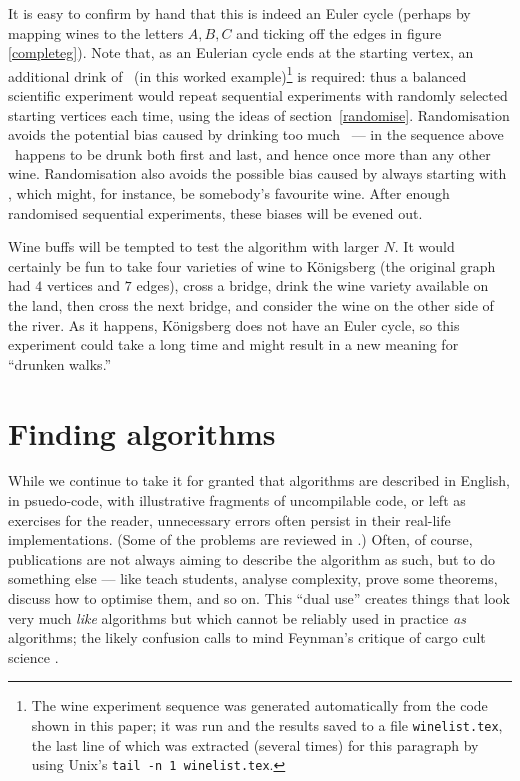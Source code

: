 \documentclass[12pt]{article}
\begin{document}
It is easy to confirm by hand that this is indeed an Euler cycle (perhaps by mapping wines to the letters $A,B,C$ and ticking off the edges in figure \ref{completeg}). Note that, as an Eulerian cycle ends at the starting vertex, an additional drink of \unskip\ (in this worked example)\footnote{The wine experiment sequence was generated automatically from the code shown in this paper; it was run and the results saved to a file \texttt{winelist.tex}, the last line of which was extracted (several times) for this paragraph by using Unix's \texttt{tail -n 1 winelist.tex}.} is required: thus a balanced scientific experiment would repeat sequential experiments with randomly selected starting vertices each time, using the ideas of section~\ref{randomise}. Randomisation avoids the potential bias caused by drinking too much \unskip\ --- in the sequence above \unskip\ happens to be drunk both first and last, and hence once more than any other wine. Randomisation also avoids the possible bias caused by always starting with \unskip, which might, for instance, be somebody's favourite wine. After enough randomised sequential experiments, these biases will be evened out.


Wine buffs will be tempted to test the algorithm with larger $N$\@. It would certainly be fun to take four varieties of wine to K\"onigsberg (the original graph had $4$ vertices and $7$ edges), cross a bridge, drink the wine variety available on the land, then cross the next bridge, and consider the wine on the other side of the river. As it happens, K\"onigsberg does not have an Euler cycle, so this experiment could take a long time and might result in a new meaning for ``drunken walks.''

\section{Finding algorithms}\label{new-approach}
While we continue to take it for granted that algorithms are described in English, in psuedo-code, with illustrative fragments of uncompilable code, or left as exercises for the reader, unnecessary errors often persist in their real-life implementations. (Some of the problems are reviewed in \cite{heedless,jmlr}.) Often, of course, publications are not always aiming to describe the algorithm as such, but to do something else --- like teach students, analyse complexity, prove some theorems, discuss how to optimise them, and so on. This ``dual use'' creates things that look very much \emph{like\/} algorithms but which cannot be reliably used in practice \emph{as\/} algorithms; the likely confusion calls to mind Feynman's critique of cargo cult science \cite{feynman}. 
\end{document}
